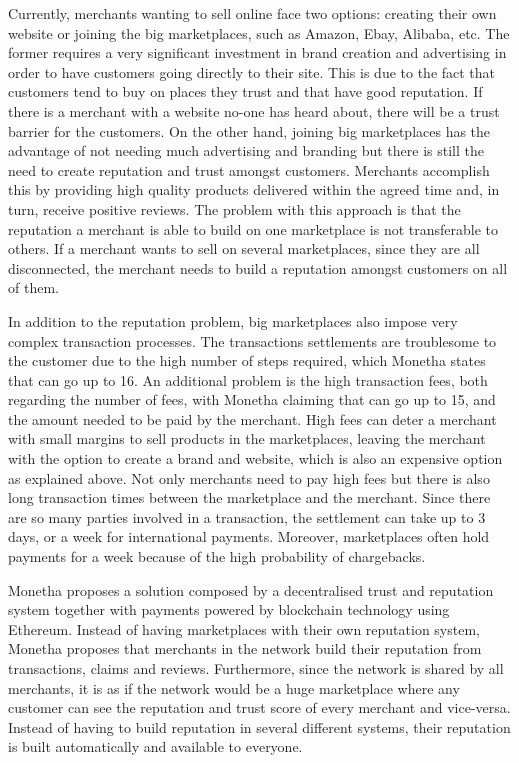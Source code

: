 Currently, merchants wanting to sell online face two options: creating their own website or joining the big marketplaces, such as Amazon, Ebay, Alibaba, etc. The former requires a very significant investment in brand creation and advertising in order to have customers going directly to their site. This is due to the fact that customers tend to buy on places they trust and that have good reputation. If there is a merchant with a website no-one has heard about, there will be a trust barrier for the customers. On the other hand, joining big marketplaces has the advantage of not needing much advertising and branding but there is still the need to create reputation and trust amongst customers. Merchants accomplish this by providing high quality products delivered within the agreed time and, in turn, receive positive reviews. The problem with this approach is that the reputation a merchant is able to build on one marketplace is not transferable to others. If a merchant wants to sell on several marketplaces, since they are all disconnected, the merchant needs to build a reputation amongst customers on all of them.

\medskip

In addition to the reputation problem, big marketplaces also impose very complex transaction processes. The transactions settlements are troublesome to the customer due to the high number of steps required, which Monetha states that can go up to 16. An additional problem is the high transaction fees, both regarding the number of fees, with Monetha claiming that can go up to 15, and the amount needed to be paid by the merchant. High fees can deter a merchant with small margins to sell products in the marketplaces, leaving the merchant with the option to create a brand and website, which is also an expensive option as explained above. Not only merchants need to pay high fees but there is also long transaction times between the marketplace and the merchant. Since there are so many parties involved in a transaction, the settlement can take up to 3 days, or a week for international payments. Moreover, marketplaces often hold payments for a week because of the high probability of chargebacks.

\medskip

Monetha proposes a solution composed by a decentralised trust and reputation system together with payments powered by blockchain technology using Ethereum. Instead of having marketplaces with their own reputation system, Monetha proposes that merchants in the network build their reputation from transactions, claims and reviews. Furthermore, since the network is shared by all merchants, it is as if the network would be a huge marketplace where any customer can see the reputation and trust score of every merchant and vice-versa. Instead of having to build reputation in several different systems, their reputation is built automatically and available to everyone.


